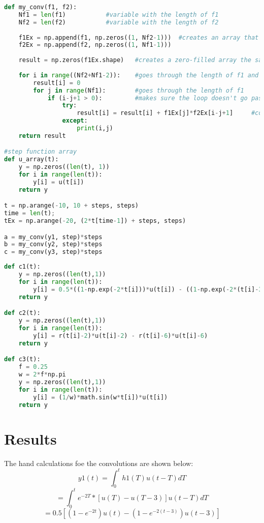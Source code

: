 \documentclass[12pt]{report}
\begin{document}
\begin{lstlisting}[language=Python, caption=Convolution and step array functions]
def my_conv(f1, f2):
    Nf1 = len(f1)           #variable with the length of f1
    Nf2 = len(f2)           #variable with the length of f2
    
    f1Ex = np.append(f1, np.zeros((1, Nf2-1)))  #creates an array that is the same size as f1 and f2
    f2Ex = np.append(f2, np.zeros((1, Nf1-1)))
    
    result = np.zeros(f1Ex.shape)   #creates a zero-filled array the same size as both functions
    
    for i in range((Nf2+Nf1-2)):    #goes through the length of f1 and f2
        result[i] = 0
        for j in range(Nf1):        #goes through the length of f1
            if (i-j+1 > 0):         #makes sure the loop doesn't go past 0 entries
                try: 
                    result[i] = result[i] + f1Ex[j]*f2Ex[i-j+1]     #combines the previous results with the product of the new entries
                except:
                    print(i,j)
    return result

#step function array
def u_array(t):
    y = np.zeros((len(t), 1))
    for i in range(len(t)):
        y[i] = u(t[i])
    return y

t = np.arange(-10, 10 + steps, steps)
time = len(t);
tEx = np.arange(-20, (2*t[time-1]) + steps, steps)

a = my_conv(y1, step)*steps
b = my_conv(y2, step)*steps
c = my_conv(y3, step)*steps
\end{lstlisting}

\begin{lstlisting}[language=Python, caption=Defining functions for plotting the hand calculations]
def c1(t):
    y = np.zeros((len(t),1))
    for i in range(len(t)):
        y[i] = 0.5*((1-np.exp(-2*t[i]))*u(t[i]) - ((1-np.exp(-2*(t[i]-3)))*u(t[i]-3)))
    return y

def c2(t):
    y = np.zeros((len(t),1))
    for i in range(len(t)):
        y[i] = r(t[i]-2)*u(t[i]-2) - r(t[i]-6)*u(t[i]-6)
    return y

def c3(t):
    f = 0.25
    w = 2*f*np.pi
    y = np.zeros((len(t),1))
    for i in range(len(t)):
        y[i] = (1/w)*math.sin(w*t[i])*u(t[i])
    return y
\end{lstlisting}

\section{Results}
The hand calculations foe the convolutions are shown below:
\begin{equation*}
    y1(t) = \int_0^t h1(T)u(t-T) dT
\end{equation*}
\begin{equation*}
        = \int_0^t e^{-2T}*[u(T) - u(T-3)]u(t-T) dT 
\end{equation*}
\begin{equation*}
    = 0.5[(1-e^{-2t})u(t) - (1-e^{-2(t-3)})u(t-3)]
\end{equation*}
\end{document}
